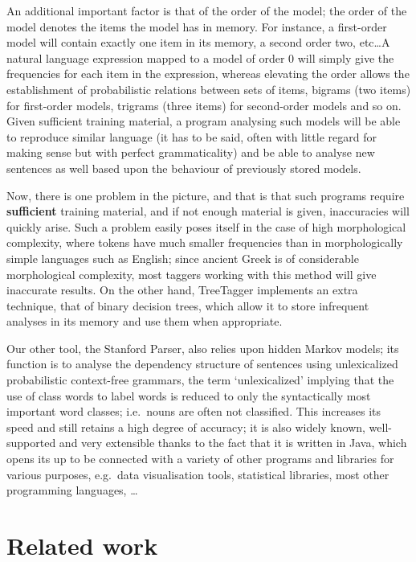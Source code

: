 An additional important factor is that of the order of the model; the order of
the model denotes the items the model has in memory. For instance, a
first-order model will contain exactly one item in its memory, a second order
two, etc\ldots A natural language expression mapped to a model of order 0 will
simply give the frequencies for each item in the expression, whereas elevating
the order allows the establishment of probabilistic relations between sets of
items, bigrams (two items) for first-order models, trigrams (three items) for
second-order models and so on. Given sufficient training material, a program
analysing such models will be able to reproduce similar language (it has to be
said, often with little regard for making sense but with perfect
grammaticality) and be able to analyse new sentences as well based upon the
behaviour of previously stored models.

Now, there is one problem in the picture, and that is that such programs
require \textbf{sufficient} training material, and if not enough material is
given, inaccuracies will quickly arise. Such a problem easily poses itself in
the case of high morphological complexity, where tokens have much smaller
frequencies than in morphologically simple languages such as English; since
ancient Greek is of considerable morphological complexity, most taggers working
with this method will give inaccurate results. On the other hand, TreeTagger
implements an extra technique, that of binary decision trees, which allow it to
store infrequent analyses in its memory and use them when appropriate.

Our other tool, the Stanford Parser, also relies upon hidden Markov models; its
function is to analyse the dependency structure of sentences using
unlexicalized probabilistic context-free grammars, the term `unlexicalized'
implying that the use of class words to label words is reduced to only the
syntactically most important word classes; i.e.\ nouns are often not
classified.  This increases its speed and still retains a high degree of
accuracy; it is also widely known, well-supported and very extensible thanks to
the fact that it is written in Java, which opens its up to be connected with a
variety of other programs and libraries for various purposes, e.g.\ data
visualisation tools, statistical libraries, most other programming languages,
\ldots

\section{Related work}